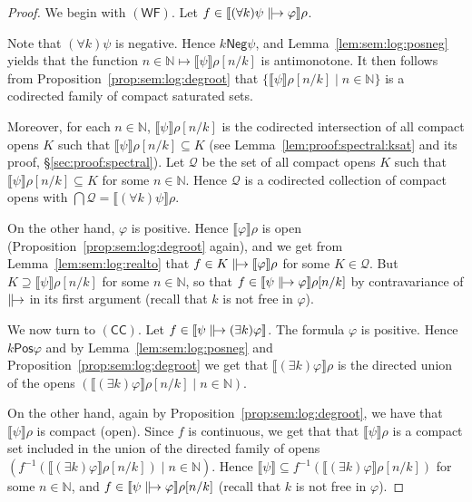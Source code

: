 \documentclass[%
  a4paper,
  UKenglish,
  cleveref,
  autoref,
  thm-restate,
  numberwithinsect,
]{lipics-v2021}
\newcommand\sle\subseteq
\newcommand\sge\supseteq
\newcommand\NN{\mathbb{N}}
\newcommand\I[1]{\llbracket #1 \rrbracket} %
\newcommand\ax[1]{(\mathsf{#1})}
\newcommand\val{\rho}	%
\newcommand\term[1]{\mathsf{#1}}
\newcommand\defrealto{\mathrel\parallel\joinrel\to}
\newcommand\realto{\mathrel{\defrealto}}
\newcommand\itvar{k}
\newcommand\Pos{\mathrel{\term{Pos}}}
\newcommand\Neg{\mathrel{\term{Neg}}}
\begin{document}
\begin{proof}
We begin with $\ax{WF}$.
Let $f \in \I{(\forall \itvar)\psi \realto \varphi}\val$.

Note that $(\forall \itvar)\psi$ is negative.
Hence $\itvar \Neg \psi$,
and Lemma~\ref{lem:sem:log:posneg}
yields that the function
$n \in \NN \mapsto \I\psi\val[n / \itvar]$ is antimonotone.
It then follows from Proposition~\ref{prop:sem:log:degroot}
that $\{\I\psi\val[n / \itvar] \mid n \in \NN\}$
is a codirected family of compact saturated sets.

Moreover, for each $n \in \NN$,
$\I\psi\val[n / \itvar]$ is the codirected
intersection of all compact opens $K$
such that $\I\psi\val[n / \itvar] \sle K$
(see Lemma~\ref{lem:proof:spectral:ksat} and its proof, \S\ref{sec:proof:spectral}).
Let $\mathcal{Q}$ be the set of all compact opens $K$
such that $\I\psi\val[n / \itvar] \sle K$ for some $n \in \NN$.
Hence $\mathcal{Q}$ is a codirected collection of compact opens
with $\bigcap \mathcal{Q} = \I{(\forall \itvar)\psi}\val$.

On the other hand, $\varphi$ is positive.
Hence $\I\varphi\val$ is open (Proposition~\ref{prop:sem:log:degroot} again),
and we get from Lemma~\ref{lem:sem:log:realto}
that $f \in K \realto \I\varphi\val$
for some $K \in \mathcal{Q}$.
But $K \sge \I\psi\val[n / \itvar]$ for some $n \in \NN$,
so that $f \in \I{\psi \realto \varphi}\val[n / \itvar]$
by contravariance of $\realto$ in its first argument
(recall that $\itvar$ is not free in $\varphi$).

We now turn to $\ax{CC}$.
Let $f \in \I{\psi \realto (\exists \itvar)\varphi}$.
The formula $\varphi$ is positive.
Hence $\itvar \Pos \varphi$
and by Lemma~\ref{lem:sem:log:posneg}
and Proposition~\ref{prop:sem:log:degroot}
we get that $\I{(\exists \itvar)\varphi}\val$
is the directed union of the opens 
$(\I{(\exists \itvar)\varphi}\val[n / \itvar] \mid n \in \NN)$.

On the other hand, again by Proposition~\ref{prop:sem:log:degroot},
we have that $\I\psi\val$ is compact (open).
Since $f$ is continuous, 
we get that that $\I\psi\val$ is a compact set included in the union
of the directed family of opens
$(f^{-1}(\I{(\exists \itvar)\varphi}\val[n / \itvar]) \mid n \in \NN)$.
Hence
$\I\psi \sle f^{-1}(\I{(\exists \itvar)\varphi}\val[n / \itvar])$
for some $n \in \NN$,
and
$f \in \I{\psi \realto \varphi}\val[n / \itvar]$
(recall that $\itvar$ is not free in $\varphi$).
\end{proof}
\end{document}
